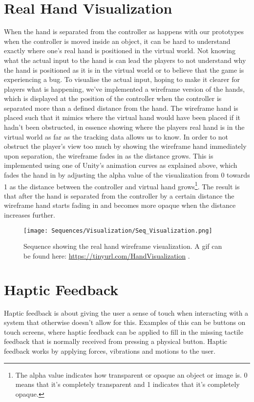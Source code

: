 \section{Real Hand Visualization}
\label{sec:handVisualization}
When the hand is separated from the controller as happens with our prototypes when the controller is moved inside an object, it can be hard to understand exactly where one's real hand is positioned in the virtual world. Not knowing what the actual input to the hand is can lead the players to not understand why the hand is positioned as it is in the virtual world or to believe that the game is experiencing a bug. To visualise the actual input, hoping to make it clearer for players what is happening, we've implemented a wireframe version of the hands, which is displayed at the position of the controller when the controller is separated more than a defined distance from the hand. The wireframe hand is placed such that it mimics where the virtual hand would have been placed if it hadn't been obstructed, in essence showing where the players real hand is in the virtual world as far as the tracking data allows us to know. In order to not obstruct the player's view too much by showing the wireframe hand immediately upon separation, the wireframe fades in as the distance grows. This is implemented using one of Unity's animation curves as explained above, which fades the hand in by adjusting the alpha value of the visualization from 0 towards 1 as the distance between the controller and virtual hand grows\footnote{The alpha value indicates how transparent or opaque an object or image is. 0 means that it's completely transparent and 1 indicates that it's completely opaque.}. The result is that after the hand is separated from the controller by a certain distance the wireframe hand starts fading in and becomes more opaque when the distance increases further.

\begin{figure}[H]
\centering
\texttt{[image: Sequences/Visualization/Seq\_Visualization.png]}
\caption{Sequence showing the real hand wireframe visualization. A gif can be found here: \url{https://tinyurl.com/HandVisualization} .}
\label{fig:visualization}
\end{figure}

\section{Haptic Feedback}
\label{sec:hapticFeedback}
Haptic feedback is about giving the user a sense of touch when interacting with a system that otherwise doesn't allow for this. Examples of this can be buttons on touch screens, where haptic feedback can be applied to fill in the missing tactile feedback that is normally received from pressing a physical button. Haptic feedback works by applying forces, vibrations and motions to the user.

